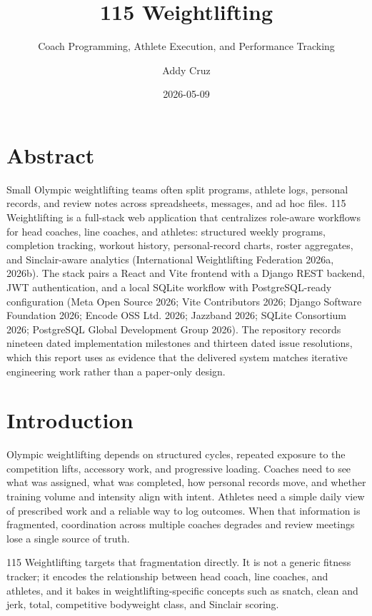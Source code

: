 \documentclass[
  letterpaper,
  DIV=11,
  numbers=noendperiod]{scrartcl}
\title{115 Weightlifting}
\subtitle{Coach Programming, Athlete Execution, and Performance
Tracking}
\author{Addy Cruz}
\date{2026-05-09}
\begin{document}
\maketitle


\section*{Abstract}\label{abstract}

Small Olympic weightlifting teams often split programs, athlete logs,
personal records, and review notes across spreadsheets, messages, and ad
hoc files. 115 Weightlifting is a full-stack web application that
centralizes role-aware workflows for head coaches, line coaches, and
athletes: structured weekly programs, completion tracking, workout
history, personal-record charts, roster aggregates, and Sinclair-aware
analytics (International Weightlifting Federation 2026a, 2026b). The
stack pairs a React and Vite frontend with a Django REST backend, JWT
authentication, and a local SQLite workflow with PostgreSQL-ready
configuration (Meta Open Source 2026; Vite Contributors 2026; Django
Software Foundation 2026; Encode OSS Ltd. 2026; Jazzband 2026; SQLite
Consortium 2026; PostgreSQL Global Development Group 2026). The
repository records nineteen dated implementation milestones and thirteen
dated issue resolutions, which this report uses as evidence that the
delivered system matches iterative engineering work rather than a
paper-only design.

\section{Introduction}\label{introduction}

Olympic weightlifting depends on structured cycles, repeated exposure to
the competition lifts, accessory work, and progressive loading. Coaches
need to see what was assigned, what was completed, how personal records
move, and whether training volume and intensity align with intent.
Athletes need a simple daily view of prescribed work and a reliable way
to log outcomes. When that information is fragmented, coordination
across multiple coaches degrades and review meetings lose a single
source of truth.

115 Weightlifting targets that fragmentation directly. It is not a
generic fitness tracker; it encodes the relationship between head coach,
line coaches, and athletes, and it bakes in weightlifting-specific
concepts such as snatch, clean and jerk, total, competitive bodyweight
class, and Sinclair scoring.
\end{document}
